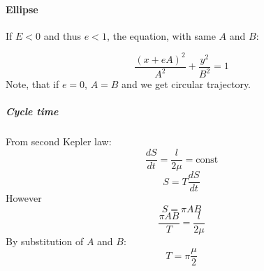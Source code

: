 \paragraph{Ellipse}
If $E<0$ and thus $e < 1$, the equation, with same $A$ and $B$:

$$\frac{(x+eA)^2}{A^2} + \frac{y^2}{B^2} = 1$$
Note, that if $e=0$, $A=B$ and we get circular trajectory.
\subparagraph{Cycle time}
From second Kepler law:
$$\frac{dS}{dt} = \frac{l}{2\mu} =  \text{const}$$
$$S = T\frac{dS}{dt}$$
However
$$S = \pi AB$$
$$\frac{\pi AB}{T} = \frac{l}{2\mu}$$
By substitution of $A$ and $B$:
$$T = \pi \frac{\mu}{2} $$
